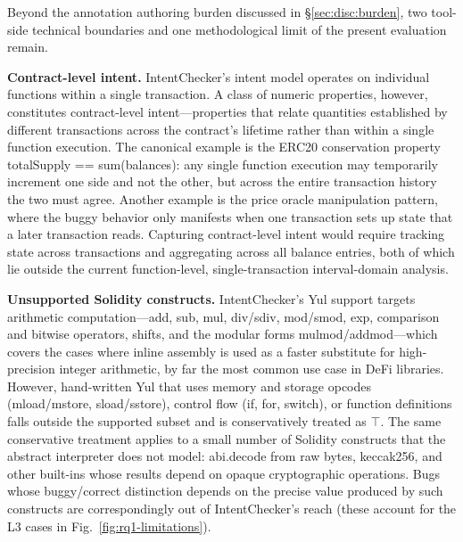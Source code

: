 \documentclass[pdflatex,sn-basic]{sn-jnl}%
\theoremstyle{thmstyleone}%
\theoremstyle{thmstyletwo}%
\theoremstyle{thmstylethree}%
\begin{document}
Beyond the annotation authoring burden discussed in \S\ref{sec:disc:burden}, two tool-side technical boundaries and one methodological limit of the present evaluation remain.

\smallskip
\noindent\textbf{Contract-level intent.}
IntentChecker's intent model operates on individual functions within a single transaction.
A class of numeric properties, however, constitutes contract-level intent---properties that relate quantities established by different transactions across the contract's lifetime rather than within a single function execution.
The canonical example is the ERC20 conservation property totalSupply == sum(balances): any single function execution may temporarily increment one side and not the other, but across the entire transaction history the two must agree.
Another example is the price oracle manipulation pattern, where the buggy behavior only manifests when one transaction sets up state that a later transaction reads.
Capturing contract-level intent would require tracking state across transactions and aggregating across all balance entries, both of which lie outside the current function-level, single-transaction interval-domain analysis.

\smallskip
\noindent\textbf{Unsupported Solidity constructs.}
IntentChecker's Yul support targets arithmetic computation---add, sub, mul, div/sdiv, mod/smod, exp, comparison and bitwise operators, shifts, and the modular forms mulmod/addmod---which covers the cases where inline assembly is used as a faster substitute for high-precision integer arithmetic, by far the most common use case in DeFi libraries.
However, hand-written Yul that uses memory and storage opcodes (mload/mstore, sload/sstore), control flow (if, for, switch), or function definitions falls outside the supported subset and is conservatively treated as $\top$.
The same conservative treatment applies to a small number of Solidity constructs that the abstract interpreter does not model: abi.decode from raw bytes, keccak256, and other built-ins whose results depend on opaque cryptographic operations.
Bugs whose buggy/correct distinction depends on the precise value produced by such constructs are correspondingly out of IntentChecker's reach (these account for the L3 cases in Fig.~\ref{fig:rq1-limitations}).
\end{document}
